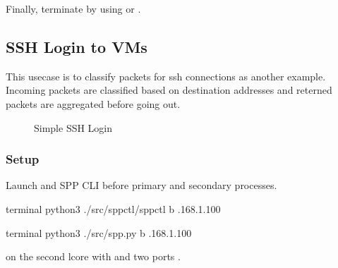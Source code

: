 \documentclass[a4paper,11pt,openany,oneside,english]{sphinxmanual}
\begin{document}
Finally, terminate  by using  or .

\begin{sphinxVerbatim}[commandchars=\\\{\},formatcom=\footnotesize]
\end{sphinxVerbatim}


\subsection{SSH Login to VMs}
\label{\detokenize{usecases/spp_vf:ssh-login-to-vms}}\label{\detokenize{usecases/spp_vf:spp-usecases-vf-ssh}}
This usecase is to classify packets for ssh connections as another example.
Incoming packets are classified based on destination addresses and reterned
packets are aggregated before going out.

\begin{figure}[htbp]
\centering
\capstart

\noindent{}
\caption{Simple SSH Login}\label{\detokenize{usecases/spp_vf:id5}}\label{\detokenize{usecases/spp_vf:figure-spp-usecase-vf-ssh-overview}}\end{figure}


\subsubsection{Setup}
\label{\detokenize{usecases/spp_vf:id1}}
Launch  and SPP CLI before primary and secondary processes.

\begin{sphinxVerbatim}[commandchars=\\\{\},formatcom=\footnotesize]
 terminal 
 python3 ./src/spp\PYGZhy{}ctl/spp\PYGZhy{}ctl \PYGZhy{}b .168.1.100
\end{sphinxVerbatim}

\begin{sphinxVerbatim}[commandchars=\\\{\},formatcom=\footnotesize]
 terminal 
 python3 ./src/spp.py \PYGZhy{}b .168.1.100
\end{sphinxVerbatim}

 on the second lcore with  and two ports .
\end{document}
